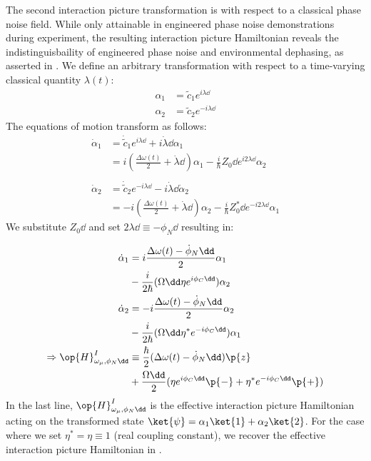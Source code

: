 The second interaction picture transformation is with respect to a classical phase noise field. While only attainable in engineered phase noise demonstrations during experiment, the resulting interaction picture Hamiltonian reveals the indistinguisbaility of engineered phase noise and environmental dephasing, as asserted in \cite{soare2014}. We define an arbitrary transformation with respect to a time-varying classical quantity $\lambda (t)$:
\begin{align}
\alpha_1 &= \tilde{c}_1e^{i\lambda\dd} \\
\alpha_2 &= \tilde{c}_2e^{-i\lambda\dd}
\end{align}
The equations of motion transform as follows:
\begin{align}
\dot{\alpha}_1 & = \dot{\tilde{c}}_1 e^{i \lambda\dd} + i \dot{\lambda}\dd \alpha_1 \nonumber \\
& =  i(\frac{\Delta \omega(t)}{2} + \dot{\lambda}\dd)\alpha_1 - \frac{i}{\hbar}Z_0\dd e^{i2\lambda\dd}\alpha_2 \\
& \nonumber \\
\dot{\alpha}_2 & = \dot{\tilde{c}}_2 e^{-i \lambda\dd} - i \dot{\lambda}\dd\dot{\alpha}_2 \nonumber \\
& =  -i(\frac{\Delta \omega(t)}{2} + \dot{\lambda}\dd)\alpha_2- \frac{i}{\hbar}Z_0^*\dd e^{-i2\lambda\dd}\alpha_1
\end{align}
We substitute $Z_0\dd$ and set $2\lambda\dd \equiv -\phi_N\dd$ resulting in:

\begin{align}
\dot{\alpha}_1 & =  i\frac{\Delta \omega(t) - \dot{\phi}_N \dd}{2}\alpha_1 \nonumber \\ %
& - \frac{i}{2\hbar}(\Omega\dd \eta e^{i\phi_C\dd}) \alpha_2  \\
\dot{\alpha}_2 & =  -i\frac{\Delta \omega(t) - \dot{\phi}_N\dd}{2}\alpha_2 \nonumber  \\ %
& - \frac{i}{2\hbar}(\Omega\dd \eta^* e^{-i\phi_C\dd})\alpha_1  \\
\Rightarrow \op{H}^{I}_{\omega_\mu,\phi_N\dd} &\equiv \frac{\hbar}{2}(\Delta \omega(t)- \dot{\phi}_N\dd)\p{z} \nonumber \\
& + \frac{\Omega\dd}{2} (\eta e^{i\phi_C\dd}\p{-} + \eta^* e^{-i\phi_C\dd}\p{+}) \label{eqn:Hi}
\end{align}
In the last line, $\op{H}^{I}_{\omega_\mu,\phi_N\dd}$ is the effective interaction picture Hamiltonian acting on the transformed state $\ket{\psi} = \alpha_1\ket{1} + \alpha_2\ket{2}$. For the case where we set $\eta^* = \eta \equiv 1$ (real coupling constant), we recover the effective interaction picture Hamiltonian in \cite{soare2014}.

